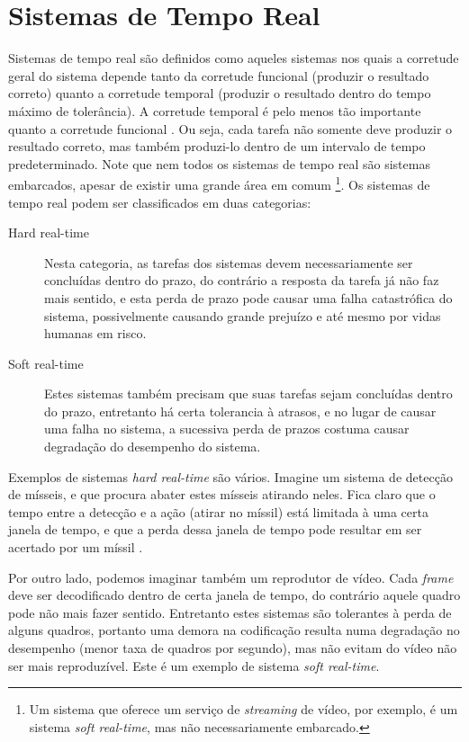 \section{Sistemas de Tempo Real}

Sistemas de tempo real são definidos como aqueles sistemas nos quais a corretude geral do sistema depende tanto da corretude funcional (produzir o resultado correto) quanto a corretude temporal (produzir o resultado dentro do tempo máximo de tolerância). A corretude temporal é pelo menos tão importante quanto a corretude funcional \cite{realtime}. Ou seja, cada tarefa não somente deve produzir o resultado correto, mas também produzi-lo dentro de um intervalo de tempo predeterminado. Note que nem todos os sistemas de tempo real são sistemas embarcados, apesar de existir uma grande área em comum \footnote{Um sistema que oferece um serviço de \emph{streaming} de vídeo, por exemplo, é um sistema \emph{soft real-time}, mas não necessariamente embarcado.}\cite{realtime}. Os sistemas de tempo real podem ser classificados em duas categorias:

\begin{description}
	\item[Hard real-time] Nesta categoria, as tarefas dos sistemas devem necessariamente ser concluídas dentro do prazo, do contrário a resposta da tarefa já não faz mais sentido, e esta perda de prazo pode causar uma falha catastrófica do sistema, possivelmente causando grande prejuízo e até mesmo por vidas humanas em risco.
	\item[Soft real-time] Estes sistemas também precisam que suas tarefas sejam concluídas dentro do prazo, entretanto há certa tolerancia à atrasos, e no lugar de causar uma falha no sistema, a sucessiva perda de prazos costuma causar degradação do desempenho do sistema.
\end{description}

Exemplos de sistemas \emph{hard real-time} são vários. Imagine um sistema de detecção de mísseis, e que procura abater estes mísseis atirando neles. Fica claro que o tempo entre a detecção e a ação (atirar no míssil) está limitada à uma certa janela de tempo, e que a perda dessa janela de tempo pode resultar em ser acertado por um míssil \cite{realtime}.

Por outro lado, podemos imaginar também um reprodutor de vídeo. Cada \emph{frame} deve ser decodificado dentro de certa janela de tempo, do contrário aquele quadro pode não mais fazer sentido. Entretanto estes sistemas são tolerantes à perda de alguns quadros, portanto uma demora na codificação resulta numa degradação no desempenho (menor taxa de quadros por segundo), mas não evitam do vídeo não ser mais reproduzível. Este é um exemplo de sistema \emph{soft real-time}.


